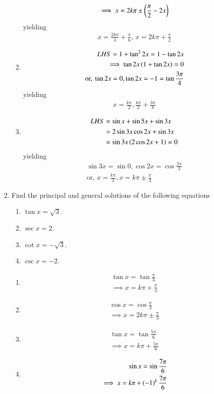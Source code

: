 \begin{enumerate}[label=\thesubsection.\arabic*,ref=\thesubsection.\theenumi]
\begin{enumerate}
\begin{align}
	 \implies x = 2k\pi \pm \left(\frac{\pi}{2}-2x\right) 
\end{align}
yielding
\begin{align}
	x = 
	  \frac{2k\pi }{3}+\frac{\pi}{6},\,
	x = 
	  2k\pi +\frac{\pi}{2}
\end{align}
\item 
\begin{align}
LHS = 1+\tan^2 2x=1-\tan2x
\\
\implies 
	\tan 2x\left(1+\tan2x\right) = 0
	\\
	\text{or, }
	\tan 2x = 0, \tan2x = -1= \tan \frac{3\pi}{4} 
\end{align}
yielding
\begin{align}
	x = \frac{k\pi}{2}, \frac{k\pi}{2}+\frac{3\pi}{8} 
\end{align}
\item 
\begin{align}
	LHS &= \sin x+\sin5x+\sin3x
	\\
	&= 2\sin 3x\cos 2x+\sin3x
	\\
	&= \sin 3x\left(2\cos 2x+1\right)=0
\end{align}
yielding
\begin{align}
 \sin 3x=\sin 0, \cos 2x=\cos \frac{2\pi}{3}
 \\
	\text{or, }
	x = \frac{k\pi}{3}, x = k\pi \pm \frac{\pi}{3}
\end{align}
\end{enumerate}
\item Find the principal and general solutions of the following equations
\begin{enumerate}
\item $\tan x=\sqrt 3$.
\item $\sec x=2$.
\item $\cot x=-\sqrt 3$.
\item $\csc x=-2$.
\end{enumerate}
\solution
\begin{enumerate}
\item 
\begin{align}
\tan x=\tan \frac{\pi}{3}
\\
\implies x = k\pi + \frac{\pi}{3}
\end{align}
\item 
\begin{align}
\cos x=\cos \frac{\pi}{3}
\\
\implies x = 2k\pi \pm \frac{\pi}{3}
\end{align}
\item 
\begin{align}
\tan x=\tan \frac{5\pi}{6}
\\
\implies
x = k\pi + \frac{5\pi}{6}
\end{align}
\item 
\begin{align}
\sin x=\sin \frac{7\pi}{6}
\\
	\implies x = k\pi + \left(-1\right)^k\frac{7\pi}{6}
\end{align}
\end{enumerate}
\end{enumerate}
